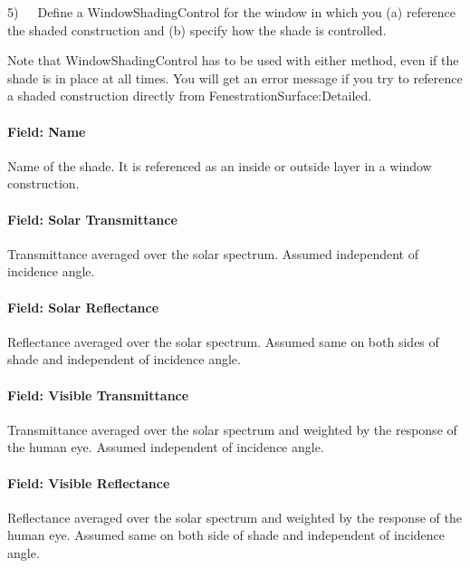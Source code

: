 5)~~~Define a WindowShadingControl for the window in which you (a) reference the shaded construction and (b) specify how the shade is controlled.

Note that WindowShadingControl has to be used with either method, even if the shade is in place at all times. You will get an error message if you try to reference a shaded construction directly from FenestrationSurface:Detailed.

\paragraph{Field: Name}\label{field-name-16-009}

Name of the shade. It is referenced as an inside or outside layer in a window construction.

\paragraph{Field: Solar Transmittance}\label{field-solar-transmittance}

Transmittance averaged over the solar spectrum. Assumed independent of incidence angle.

\paragraph{Field: Solar Reflectance}\label{field-solar-reflectance}

Reflectance averaged over the solar spectrum. Assumed same on both sides of shade and independent of incidence angle.

\paragraph{Field: Visible Transmittance}\label{field-visible-transmittance-1}

Transmittance averaged over the solar spectrum and weighted by the response of the human eye. Assumed independent of incidence angle.

\paragraph{Field: Visible Reflectance}\label{field-visible-reflectance}

Reflectance averaged over the solar spectrum and weighted by the response of the human eye. Assumed same on both side of shade and independent of incidence angle.

